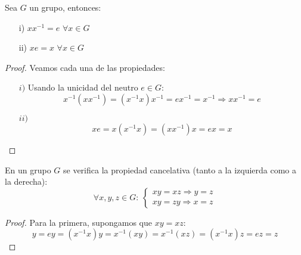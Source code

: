\begin{prop}
    Sea $G$ un grupo, entonces:
    \begin{enumerate}
        \item[i)] $xx^{-1} = e$ $\forall x\in G$
        \item[ii)]  $xe = x$ $\forall x\in G$
    \end{enumerate}
    \begin{proof}
        Veamos cada una de las propiedades:
        \begin{enumerate}
            \item[$i)$] Usando la unicidad del neutro $e\in G$:
                \begin{equation*}
                    x^{-1}(xx^{-1}) = (x^{-1}x)x^{-1} = ex^{-1} = x^{-1} \Longrightarrow xx^{-1} = e
                \end{equation*}
            \item[$ii)$]
                \begin{equation*}
                    xe = x(x^{-1}x) = (xx^{-1})x = ex = x
                \end{equation*}
        \end{enumerate}
    \end{proof}
\end{prop}

\begin{prop}
    En un grupo $G$ se verifica la propiedad cancelativa (tanto a la izquierda como a la derecha):
    \begin{equation*}
        \forall x,y,z\in G:\ \left\{\begin{array}{l}
            xy = xz \Longrightarrow y = z \\
            xy = zy \Longrightarrow x = z
        \end{array}\right.
    \end{equation*}
    \begin{proof}
        Para la primera, supongamos que $xy=xz$:
        \begin{equation*}
            y = ey = (x^{-1}x)y = x^{-1}(xy) = x^{-1}(xz) = (x^{-1}x)z = ez = z
        \end{equation*}
    \end{proof}
\end{prop}

